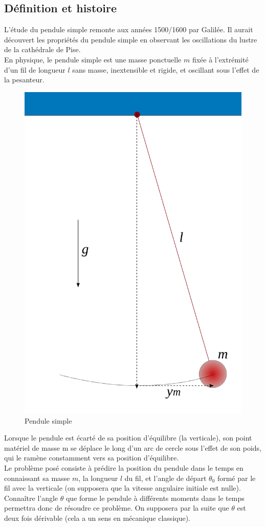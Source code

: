 \documentclass[9pt,a4paper]{article}
\begin{document}
\subsection{Définition et histoire}
L'étude du pendule simple remonte aux années 1500/1600 par Galilée. Il aurait découvert les propriétés du pendule simple en observant les oscillations du lustre de la cathédrale de Pise.\\
En physique, le pendule simple est une masse ponctuelle $m$ fixée à l'extrémité d'un fil de longueur $l$ sans masse, inextensible et rigide, et oscillant sous l'effet de la pesanteur.
\begin{figure}
  \centering
  \includegraphics[scale=0.2]{Pendulum.png}
  \caption{Pendule simple}
  \label{fig:pendule simple}
\end{figure}
Lorsque le pendule est écarté de sa position d'équilibre (la verticale), son point matériel de masse m se déplace le long d'un arc de cercle sous l'effet de son poids, qui le ramène constamment vers sa position d'équilibre.\\
Le problème posé consiste à prédire la position du pendule dans le temps en connaissant sa masse $m$, la longueur $l$ du fil, et l'angle de départ $\theta_0$ formé par le fil avec la verticale (on supposera que la vitesse angulaire initiale est nulle). Connaître l'angle $\theta$ que forme le pendule à différents moments dans le temps permettra donc de résoudre ce problème. On supposera par la suite que $\theta$ est deux fois dérivable (cela a un sens en mécanique classique).
\end{document}
